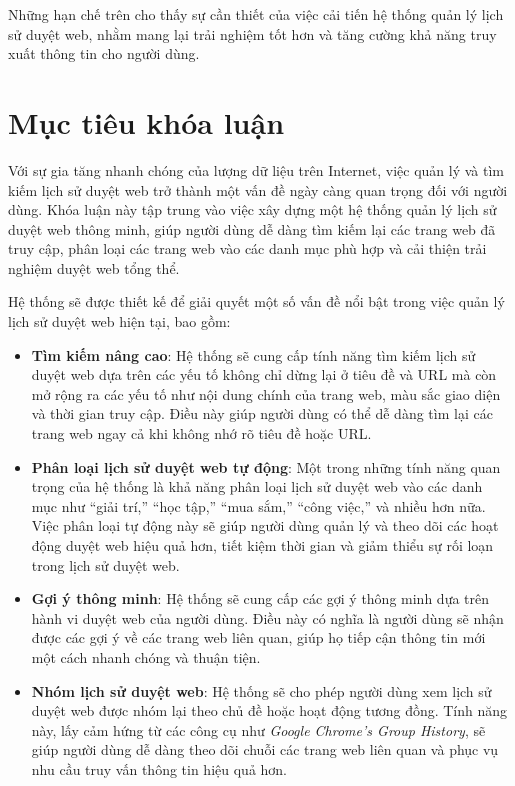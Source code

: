 Những hạn chế trên cho thấy sự cần thiết của việc cải tiến hệ thống quản lý lịch sử duyệt web, nhằm mang lại trải nghiệm tốt hơn và tăng cường khả năng truy xuất thông tin cho người dùng.

\section{Mục tiêu khóa luận}

Với sự gia tăng nhanh chóng của lượng dữ liệu trên Internet, việc quản lý và tìm kiếm lịch sử duyệt web trở thành một vấn đề ngày càng quan trọng đối với người dùng. Khóa luận này tập trung vào việc xây dựng một hệ thống quản lý lịch sử duyệt web thông minh, giúp người dùng dễ dàng tìm kiếm lại các trang web đã truy cập, phân loại các trang web vào các danh mục phù hợp và cải thiện trải nghiệm duyệt web tổng thể.

Hệ thống sẽ được thiết kế để giải quyết một số vấn đề nổi bật trong việc quản lý lịch sử duyệt web hiện tại, bao gồm:
\begin{itemize}
    \item \textbf{Tìm kiếm nâng cao}: Hệ thống sẽ cung cấp tính năng tìm kiếm lịch sử duyệt web dựa trên các yếu tố không chỉ dừng lại ở tiêu đề và URL mà còn mở rộng ra các yếu tố như nội dung chính của trang web, màu sắc giao diện và thời gian truy cập. Điều này giúp người dùng có thể dễ dàng tìm lại các trang web ngay cả khi không nhớ rõ tiêu đề hoặc URL.
    
    \item \textbf{Phân loại lịch sử duyệt web tự động}: Một trong những tính năng quan trọng của hệ thống là khả năng phân loại lịch sử duyệt web vào các danh mục như ``giải trí,'' ``học tập,'' ``mua sắm,'' ``công việc,'' và nhiều hơn nữa. Việc phân loại tự động này sẽ giúp người dùng quản lý và theo dõi các hoạt động duyệt web hiệu quả hơn, tiết kiệm thời gian và giảm thiểu sự rối loạn trong lịch sử duyệt web.
    
    \item \textbf{Gợi ý thông minh}: Hệ thống sẽ cung cấp các gợi ý thông minh dựa trên hành vi duyệt web của người dùng. Điều này có nghĩa là người dùng sẽ nhận được các gợi ý về các trang web liên quan, giúp họ tiếp cận thông tin mới một cách nhanh chóng và thuận tiện.
    
    \item \textbf{Nhóm lịch sử duyệt web}: Hệ thống sẽ cho phép người dùng xem lịch sử duyệt web được nhóm lại theo chủ đề hoặc hoạt động tương đồng. Tính năng này, lấy cảm hứng từ các công cụ như \textit{Google Chrome's Group History}, sẽ giúp người dùng dễ dàng theo dõi chuỗi các trang web liên quan và phục vụ nhu cầu truy vấn thông tin hiệu quả hơn.
\end{itemize}

